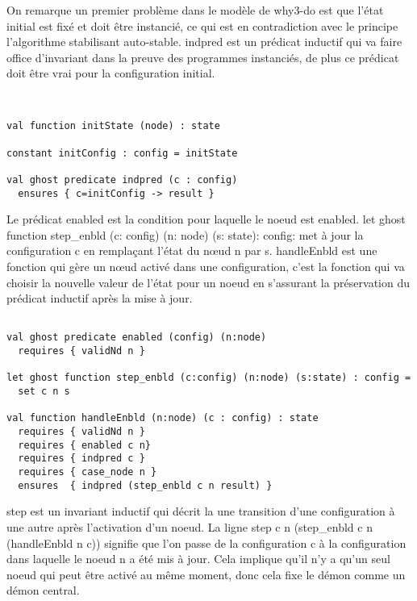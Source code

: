 \documentclass[11pt]{article}
\begin{document}
On remarque un premier problème dans le modèle de why3-do est que l'état initial est fixé et 
doit être instancié,
ce qui est en contradiction avec le principe l'algorithme stabilisant auto-stable. 
indpred est un prédicat inductif qui va faire office d'invariant dans la preuve des programmes instanciés, 
de plus ce prédicat doit être vrai pour la configuration initial. 

\begin{verbatim}


val function initState (node) : state

constant initConfig : config = initState

val ghost predicate indpred (c : config)
  ensures { c=initConfig -> result }

\end{verbatim}
Le prédicat enabled est la condition pour laquelle le noeud est enabled.
let ghost function step\_enbld (c: config) (n: node) (s: state): config: met à jour la configuration c en remplaçant l'état du nœud n par s.
handleEnbld est une fonction qui gère un nœud activé dans une configuration, c'est la fonction qui va choisir la nouvelle valeur de l'état pour un noeud
en s'assurant la préservation du prédicat inductif après la mise à jour. 
\begin{verbatim}

val ghost predicate enabled (config) (n:node)
  requires { validNd n }

let ghost function step_enbld (c:config) (n:node) (s:state) : config =
  set c n s

val function handleEnbld (n:node) (c : config) : state
  requires { validNd n }
  requires { enabled c n}
  requires { indpred c }
  requires { case_node n }
  ensures  { indpred (step_enbld c n result) }

\end{verbatim}

step est un invariant inductif qui décrit la une transition d'une configuration à une autre après l'activation d'un noeud.
La ligne step c n (step\_enbld c n (handleEnbld n c)) signifie que l'on passe de la configuration c à la configuration dans laquelle le noeud n a été mis à jour. 
Cela implique qu'il n'y a qu'un seul noeud qui peut être activé au même moment, donc cela fixe le démon comme un démon central. 
\end{document}
